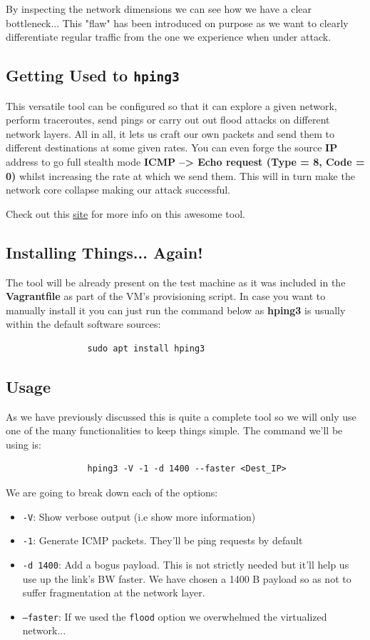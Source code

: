 \documentclass[12pt]{report}
\newcommand{\newpar} {
    \vskip 1cm
}
\begin{document}
				By inspecting the network dimensions we can see how we have a clear bottleneck... This "flaw" has been introduced on purpose as we want to clearly differentiate regular traffic from the one we experience when under attack.

		\subsection{Getting Used to \texttt{hping3}}
			This versatile tool can be configured so that it can explore a given network, perform traceroutes, send pings or carry out out flood attacks on different network layers. All in all, it lets us craft our own packets and send them to different destinations at some given rates. You can even forge the source \textbf{IP} address to go full stealth mode   \textbf{ICMP --> Echo request (Type = 8, Code = 0)} whilst increasing the rate at which we send them. This will in turn make the network core collapse making our attack successful.
			\newpar
			Check out this \href{https://tools.kali.org/information-gathering/hping3}{site} for more info on this awesome tool.

		\subsection{Installing Things... Again!}
			The tool will be already present on the test machine as it was included in the \textbf{Vagrantfile} as part of the VM's provisioning script. In case you want to manually install it you can just run the command below as \textbf{hping3} is usually within the default software sources:

			\begin{verbatim}
				sudo apt install hping3
			\end{verbatim}

		\subsection{Usage}
			As we have previously discussed this is quite a complete tool so we will only use one of the many functionalities to keep things simple. The command we'll be using is:

			\begin{verbatim}
				hping3 -V -1 -d 1400 --faster <Dest_IP>
			\end{verbatim}

			We are going to break down each of the options:

			\begin{itemize}
				\item \texttt{-V}: Show verbose output (i.e show more information)
				\item \texttt{-1}: Generate ICMP packets. They'll be ping requests by default
				\item \texttt{-d 1400}: Add a bogus payload. This is not strictly needed but it'll help us use up the link's BW faster. We have chosen a 1400 B payload so as not to suffer fragmentation at the network layer.
				\item \texttt{--faster}: If we used the \texttt{flood} option we overwhelmed the virtualized network...
			\end{itemize}
\end{document}
